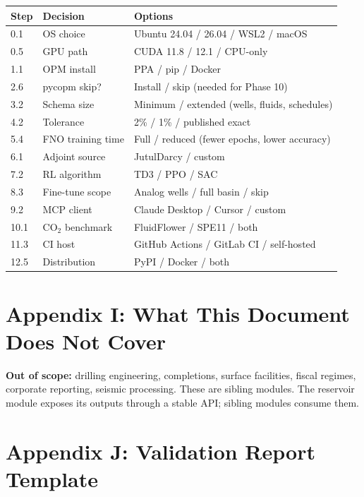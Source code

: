\documentclass[10pt,a4paper]{article}
\begin{document}
\begin{longtable}{@{}p{1.4cm}p{5.2cm}p{6.6cm}@{}}
\toprule
Step & Decision & Options\\
\midrule
\endhead
0.1 & OS choice & Ubuntu 24.04 / 26.04 / WSL2 / macOS\\
0.5 & GPU path & CUDA 11.8 / 12.1 / CPU-only\\
1.1 & OPM install & PPA / pip / Docker\\
2.6 & pycopm skip? & Install / skip (needed for Phase 10)\\
3.2 & Schema size & Minimum / extended (wells, fluids, schedules)\\
4.2 & Tolerance & 2\% / 1\% / published exact\\
5.4 & FNO training time & Full / reduced (fewer epochs, lower accuracy)\\
6.1 & Adjoint source & JutulDarcy / custom\\
7.2 & RL algorithm & TD3 / PPO / SAC\\
8.3 & Fine-tune scope & Analog wells / full basin / skip\\
9.2 & MCP client & Claude Desktop / Cursor / custom\\
10.1 & CO$_2$ benchmark & FluidFlower / SPE11 / both\\
11.3 & CI host & GitHub Actions / GitLab CI / self-hosted\\
12.5 & Distribution & PyPI / Docker / both\\
\bottomrule
\end{longtable}

\section{Appendix I: What This Document Does Not Cover}

\begin{failure}
\textbf{Out of scope:} drilling engineering, completions, surface facilities, fiscal regimes, corporate reporting, seismic processing. These are sibling modules. The reservoir module exposes its outputs through a stable API; sibling modules consume them.
\end{failure}

\section{Appendix J: Validation Report Template}
\end{document}
